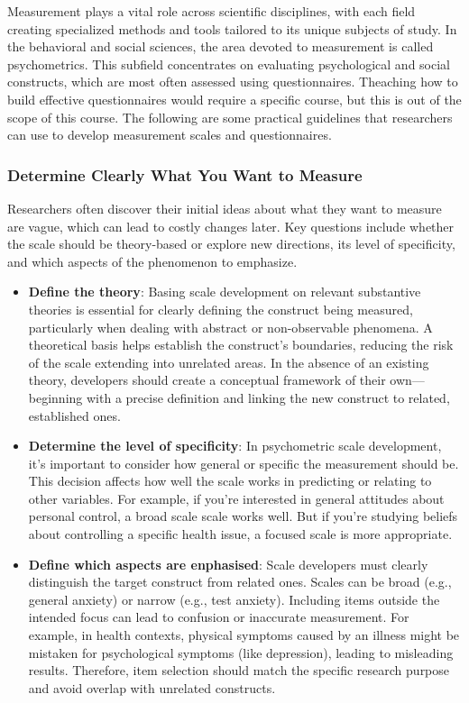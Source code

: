 \documentclass[
  letterpaper,
  DIV=11,
  numbers=noendperiod]{scrartcl}
\begin{document}
Measurement plays a vital role across scientific disciplines, with each
field creating specialized methods and tools tailored to its unique
subjects of study. In the behavioral and social sciences, the area
devoted to measurement is called psychometrics. This subfield
concentrates on evaluating psychological and social constructs, which
are most often assessed using questionnaires. Theaching how to build
effective questionnaires would require a specific course, but this is
out of the scope of this course. The following are some practical
guidelines that researchers can use to develop measurement scales and
questionnaires.

\hypertarget{determine-clearly-what-you-want-to-measure}{%
\subsubsection*{Determine Clearly What You Want to
Measure}\label{determine-clearly-what-you-want-to-measure}}

Researchers often discover their initial ideas about what they want to
measure are vague, which can lead to costly changes later. Key questions
include whether the scale should be theory-based or explore new
directions, its level of specificity, and which aspects of the
phenomenon to emphasize.

\begin{itemize}
\item
  \textbf{Define the theory}: Basing scale development on relevant
  substantive theories is essential for clearly defining the construct
  being measured, particularly when dealing with abstract or
  non-observable phenomena. A theoretical basis helps establish the
  construct's boundaries, reducing the risk of the scale extending into
  unrelated areas. In the absence of an existing theory, developers
  should create a conceptual framework of their own---beginning with a
  precise definition and linking the new construct to related,
  established ones.
\item
  \textbf{Determine the level of specificity}: In psychometric scale
  development, it's important to consider how general or specific the
  measurement should be. This decision affects how well the scale works
  in predicting or relating to other variables. For example, if you're
  interested in general attitudes about personal control, a broad scale
  scale works well. But if you're studying beliefs about controlling a
  specific health issue, a focused scale is more appropriate.
\item
  \textbf{Define which aspects are enphasised}: Scale developers must
  clearly distinguish the target construct from related ones. Scales can
  be broad (e.g., general anxiety) or narrow (e.g., test anxiety).
  Including items outside the intended focus can lead to confusion or
  inaccurate measurement. For example, in health contexts, physical
  symptoms caused by an illness might be mistaken for psychological
  symptoms (like depression), leading to misleading results. Therefore,
  item selection should match the specific research purpose and avoid
  overlap with unrelated constructs.
\end{itemize}
\end{document}
